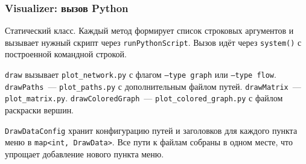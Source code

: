 \subsubsection{Visualizer: вызов Python}

Статический класс. Каждый метод формирует список строковых аргументов
и вызывает нужный скрипт через \texttt{runPythonScript}. Вызов идёт через \texttt{system()} с построенной
командной строкой.

\texttt{draw} вызывает \texttt{plot\_network.py} с флагом \texttt{--type graph}
или \texttt{--type flow}. \texttt{drawPaths}~--- \texttt{plot\_paths.py}
с дополнительным файлом путей. \texttt{drawMatrix}~--- \texttt{plot\_matrix.py}.
\texttt{drawColoredGraph}~--- \texttt{plot\_colored\_graph.py} с файлом
раскраски вершин.

\texttt{DrawDataConfig} хранит конфигурацию путей и заголовков для каждого
пункта меню в \texttt{map<int, DrawData>}. Все пути к файлам
собраны в одном месте, что упрощает добавление нового пункта меню.
